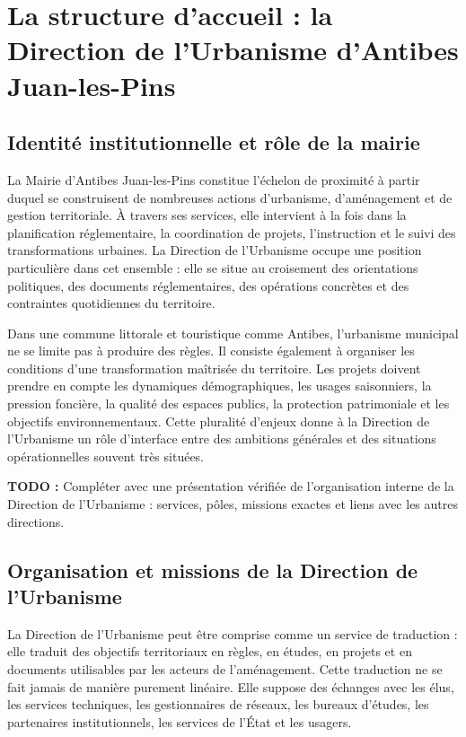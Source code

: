 \documentclass[11pt,a4paper]{report}
\newcommand{\todo}[1]{\textcolor{todored}{\textbf{TODO :} #1}}
\begin{document}
\section{La structure d'accueil : la Direction de l'Urbanisme d'Antibes Juan-les-Pins}

\subsection{Identité institutionnelle et rôle de la mairie}

La Mairie d'Antibes Juan-les-Pins constitue l'échelon de proximité à partir duquel se construisent de nombreuses actions d'urbanisme, d'aménagement et de gestion territoriale. À travers ses services, elle intervient à la fois dans la planification réglementaire, la coordination de projets, l'instruction et le suivi des transformations urbaines. La Direction de l'Urbanisme occupe une position particulière dans cet ensemble : elle se situe au croisement des orientations politiques, des documents réglementaires, des opérations concrètes et des contraintes quotidiennes du territoire.

Dans une commune littorale et touristique comme Antibes, l'urbanisme municipal ne se limite pas à produire des règles. Il consiste également à organiser les conditions d'une transformation maîtrisée du territoire. Les projets doivent prendre en compte les dynamiques démographiques, les usages saisonniers, la pression foncière, la qualité des espaces publics, la protection patrimoniale et les objectifs environnementaux. Cette pluralité d'enjeux donne à la Direction de l'Urbanisme un rôle d'interface entre des ambitions générales et des situations opérationnelles souvent très situées.

\todo{Compléter avec une présentation vérifiée de l'organisation interne de la Direction de l'Urbanisme : services, pôles, missions exactes et liens avec les autres directions.}

\subsection{Organisation et missions de la Direction de l'Urbanisme}

La Direction de l'Urbanisme peut être comprise comme un service de traduction : elle traduit des objectifs territoriaux en règles, en études, en projets et en documents utilisables par les acteurs de l'aménagement. Cette traduction ne se fait jamais de manière purement linéaire. Elle suppose des échanges avec les élus, les services techniques, les gestionnaires de réseaux, les bureaux d'études, les partenaires institutionnels, les services de l'État et les usagers.
\end{document}
